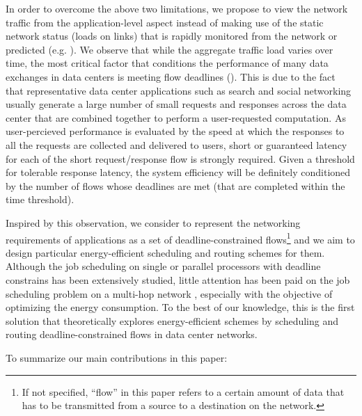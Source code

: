 \documentclass[10pt, conference, compsocconf]{IEEEtran}
\begin{document}
In order to overcome the above two limitations, we propose to view the network traffic from the application-level aspect instead of making use of the static network status (loads on links) that is rapidly monitored from the network or predicted (e.g. \cite{Heller_Seetharaman}). We observe that while the aggregate traffic load varies over time, the most critical factor that conditions the performance of many data exchanges in data centers is meeting flow deadlines  (\cite{Wilson_Ballani, Vamanan_Hasan, Hong_Caesar, Zats_Das, Alizadeh_Yang}). This is due to the fact that representative data center applications such as search and social networking usually generate a large number of small requests and responses across the data center that are combined together to perform a user-requested computation. As user-percieved performance is evaluated by the speed at which the responses to all the requests are collected and delivered to users, short or guaranteed latency for each of the short request/response flow is strongly required. Given a threshold for tolerable response latency, the system efficiency will be definitely conditioned by the number of flows whose deadlines are met (that are completed within the time threshold).


Inspired by this observation, we consider to represent the networking requirements of applications as a set of deadline-constrained flows\footnote{If not specified, ``flow'' in this paper refers to a certain amount of data that has to be transmitted from a source to a destination on the network.} and we aim to design particular energy-efficient scheduling and routing schemes for them. Although the job scheduling on single or parallel processors with deadline constrains has been extensively studied, little attention has been paid on the job scheduling problem on a multi-hop network \cite{Mao_Koksal}, especially with the objective of optimizing the energy consumption. To the best of our knowledge, this is the first solution that theoretically explores energy-efficient schemes by scheduling and routing deadline-constrained flows in data center networks.


To summarize our main contributions in this paper:
\end{document}
